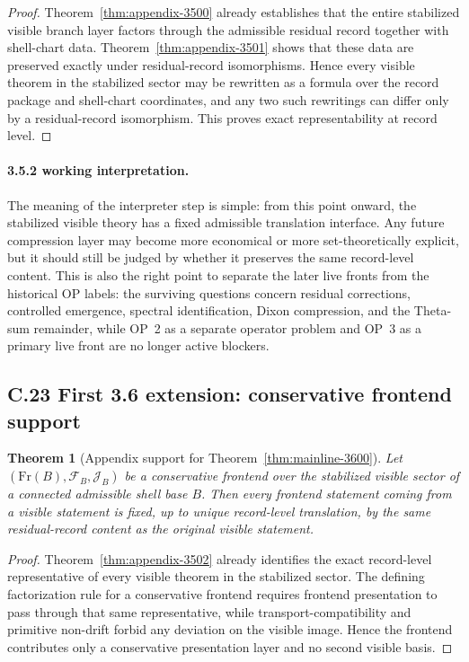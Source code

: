 \documentclass[12pt,a4paper]{article}
\newtheorem{theorem}{Theorem}[section]
\begin{document}
\begin{proof}
Theorem~\ref{thm:appendix-3500} already establishes that the entire stabilized visible branch layer factors through the admissible residual record together with shell-chart data. Theorem~\ref{thm:appendix-3501} shows that these data are preserved exactly under residual-record isomorphisms. Hence every visible theorem in the stabilized sector may be rewritten as a formula over the record package and shell-chart coordinates, and any two such rewritings can differ only by a residual-record isomorphism. This proves exact representability at record level.
\end{proof}

\paragraph{3.5.2 working interpretation.}
The meaning of the interpreter step is simple: from this point onward, the stabilized visible theory has a fixed admissible translation interface. Any future compression layer may become more economical or more set-theoretically explicit, but it should still be judged by whether it preserves the same record-level content. This is also the right point to separate the later live fronts from the historical OP labels: the surviving questions concern residual corrections, controlled emergence, spectral identification, Dixon compression, and the Theta-sum remainder, while OP~2 as a separate operator problem and OP~3 as a primary live front are no longer active blockers.



\subsection*{C.23 First 3.6 extension: conservative frontend support}

\begin{theorem}[Appendix support for Theorem~\ref{thm:mainline-3600}]
\label{thm:appendix-3600}
Let $(\mathrm{Fr}(B),\mathcal F_B,\mathcal J_B)$ be a conservative frontend over the stabilized visible sector of a connected admissible shell base $B$. Then every frontend statement coming from a visible statement is fixed, up to unique record-level translation, by the same residual-record content as the original visible statement.
\end{theorem}

\begin{proof}
Theorem~\ref{thm:appendix-3502} already identifies the exact record-level representative of every visible theorem in the stabilized sector. The defining factorization rule for a conservative frontend requires frontend presentation to pass through that same representative, while transport-compatibility and primitive non-drift forbid any deviation on the visible image. Hence the frontend contributes only a conservative presentation layer and no second visible basis.
\end{proof}
\end{document}
